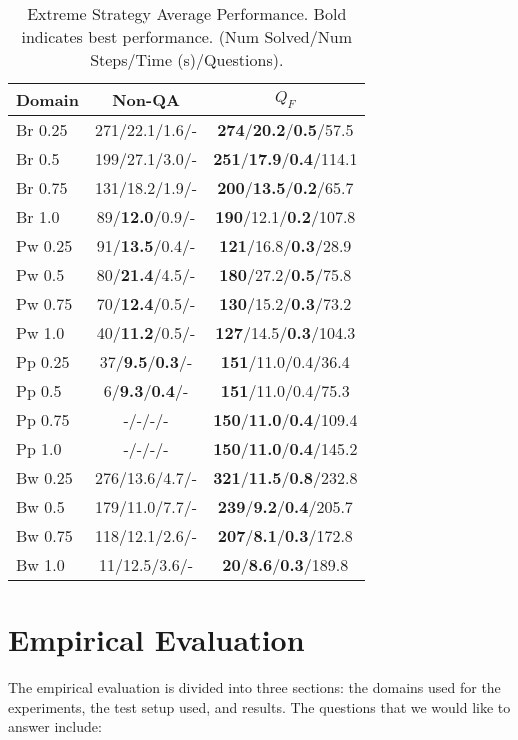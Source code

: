 \documentclass{article}
\begin{document}
\begin{table}\small\centering\begin{tabular}{|l|cc|}\hline
Domain & Non-QA  &  $Q_F$ \\ \hline
Br	0.25	&271/22.1/1.6/- 	&{\bf 274}/{\bf 20.2}/{\bf 0.5}/57.5 	\\ \hline
Br	0.5	&199/27.1/3.0/- 	&{\bf 251}/{\bf 17.9}/{\bf 0.4}/114.1 	\\ \hline
Br	0.75	&131/18.2/1.9/- 	&{\bf 200}/{\bf 13.5}/{\bf 0.2}/65.7 	\\ \hline
Br	1.0	&89/{\bf 12.0}/0.9/- 	&{\bf 190}/12.1/{\bf 0.2}/107.8 	\\ \hline
\hline
Pw	0.25	&91/{\bf 13.5}/0.4/- 	&{\bf 121}/16.8/{\bf 0.3}/28.9 	\\ \hline
Pw	0.5	&80/{\bf 21.4}/4.5/- 	&{\bf 180}/27.2/{\bf 0.5}/75.8 	\\ \hline
Pw	0.75	&70/{\bf 12.4}/0.5/- 	&{\bf 130}/15.2/{\bf 0.3}/73.2 	\\ \hline
Pw	1.0	&40/{\bf 11.2}/0.5/- 	&{\bf 127}/14.5/{\bf 0.3}/104.3 	\\ \hline
\hline
Pp	0.25	&37/{\bf 9.5}/{\bf 0.3}/- 	&{\bf 151}/11.0/0.4/36.4 	\\ \hline
Pp	0.5	&6/{\bf 9.3}/{\bf 0.4}/- 	&{\bf 151}/11.0/0.4/75.3 	\\ \hline
Pp	0.75	&-/-/-/-  	&{\bf 150}/{\bf 11.0}/{\bf 0.4}/109.4 	\\ \hline
Pp	1.0	&-/-/-/-  	&{\bf 150}/{\bf 11.0}/{\bf 0.4}/145.2 	\\ \hline
\hline
Bw	0.25	&276/13.6/4.7/- 	&{\bf 321}/{\bf 11.5}/{\bf 0.8}/232.8 	\\ \hline
Bw	0.5	&179/11.0/7.7/- 	&{\bf 239}/{\bf 9.2}/{\bf 0.4}/205.7 	\\ \hline
Bw	0.75	&118/12.1/2.6/- 	&{\bf 207}/{\bf 8.1}/{\bf 0.3}/172.8 	\\ \hline
Bw	1.0	&11/12.5/3.6/- 	&{\bf 20}/{\bf 8.6}/{\bf 0.3}/189.8 	\\ \hline
\end{tabular}\caption{\label{tab:questionComp2} Extreme Strategy Average
Performance. Bold indicates best performance.  (Num Solved/Num
Steps/Time (s)/Questions).}\end{table}
 



\section{Empirical Evaluation}
The empirical evaluation is divided into three sections:  the domains used for
the experiments, the test setup used, and results.  The questions that we would like to answer
include:
\end{document}
